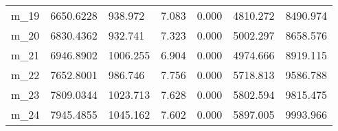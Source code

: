 \begin{tabular}{lllllll}
m_19 &  6650.6228 &   938.972 &     7.083 &  0.000 &  4810.272 &  8490.974 \\
m_20 &  6830.4362 &   932.741 &     7.323 &  0.000 &  5002.297 &  8658.576 \\
m_21 &  6946.8902 &  1006.255 &     6.904 &  0.000 &  4974.666 &  8919.115 \\
m_22 &  7652.8001 &   986.746 &     7.756 &  0.000 &  5718.813 &  9586.788 \\
m_23 &  7809.0344 &  1023.713 &     7.628 &  0.000 &  5802.594 &  9815.475 \\
m_24 &  7945.4855 &  1045.162 &     7.602 &  0.000 &  5897.005 &  9993.966 \\
\bottomrule
\end{tabular}
